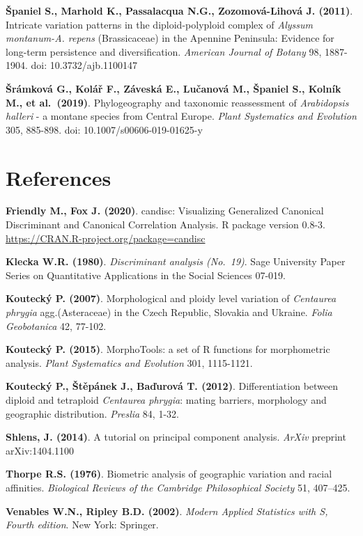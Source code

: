 \documentclass[
]{article}
\begin{document}
\textbf{Španiel S., Marhold K., Passalacqua N.G., Zozomová-Lihová J.
(2011)}. Intricate variation patterns in the diploid-polyploid complex
of \emph{Alyssum montanum-A. repens} (Brassicaceae) in the Apennine
Peninsula: Evidence for long-term persistence and diversification.
\emph{American Journal of Botany} 98, 1887-1904. doi:
10.3732/ajb.1100147

\textbf{Šrámková G., Kolář F., Záveská E., Lučanová M., Španiel S.,
Kolník M., et al.~(2019)}. Phylogeography and taxonomic reassessment of
\emph{Arabidopsis halleri} - a montane species from Central Europe.
\emph{Plant Systematics and Evolution} 305, 885-898. doi:
10.1007/s00606-019-01625-y

\hypertarget{references}{%
\section{References}\label{references}}

\textbf{Friendly M., Fox J. (2020)}. candisc: Visualizing Generalized
Canonical Discriminant and Canonical Correlation Analysis. R package
version 0.8-3. \url{https://CRAN.R-project.org/package=candisc}

\textbf{Klecka W.R. (1980)}. \emph{Discriminant analysis (No.~19)}. Sage
University Paper Series on Quantitative Applications in the Social
Sciences 07-019.

\textbf{Koutecký P. (2007)}. Morphological and ploidy level variation of
\emph{Centaurea phrygia} agg.(Asteraceae) in the Czech Republic,
Slovakia and Ukraine. \emph{Folia Geobotanica} 42, 77-102.

\textbf{Koutecký P. (2015)}. MorphoTools: a set of R functions for
morphometric analysis. \emph{Plant Systematics and Evolution} 301,
1115-1121.

\textbf{Koutecký P., Štěpánek J., Baďurová T. (2012)}. Differentiation
between diploid and tetraploid \emph{Centaurea phrygia}: mating
barriers, morphology and geographic distribution. \emph{Preslia} 84,
1-32.

\textbf{Shlens, J. (2014)}. A tutorial on principal component analysis.
\emph{ArXiv} preprint arXiv:1404.1100

\textbf{Thorpe R.S. (1976)}. Biometric analysis of geographic variation
and racial affinities. \emph{Biological Reviews of the Cambridge
Philosophical Society} 51, 407--425.

\textbf{Venables W.N., Ripley B.D. (2002)}. \emph{Modern Applied
Statistics with S, Fourth edition}. New York: Springer.
\end{document}
